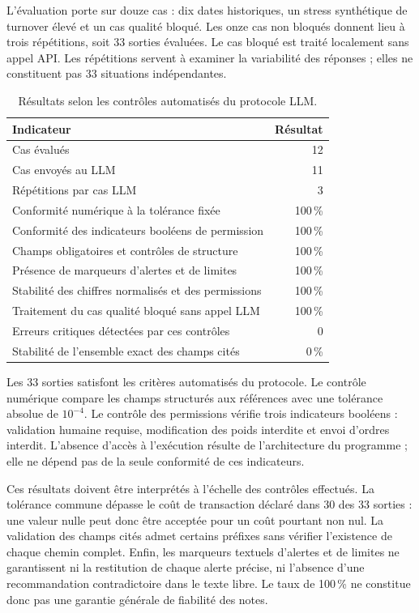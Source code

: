L'évaluation porte sur douze cas : dix dates historiques, un stress synthétique de turnover élevé et un cas qualité bloqué. Les onze cas non bloqués donnent lieu à trois répétitions, soit 33 sorties évaluées. Le cas bloqué est traité localement sans appel API. Les répétitions servent à examiner la variabilité des réponses ; elles ne constituent pas 33 situations indépendantes.

\begin{table}[H]
\centering
\caption{Résultats selon les contrôles automatisés du protocole LLM.}
\label{tab:evaluation-llm}
\scriptsize
\begin{tabular}{p{}r}
\toprule
\textbf{Indicateur} & \textbf{Résultat} \\
\midrule
Cas évalués & 12 \\
Cas envoyés au LLM & 11 \\
Répétitions par cas LLM & 3 \\
Conformité numérique à la tolérance fixée & 100\,\% \\
Conformité des indicateurs booléens de permission & 100\,\% \\
Champs obligatoires et contrôles de structure & 100\,\% \\
Présence de marqueurs d'alertes et de limites & 100\,\% \\
Stabilité des chiffres normalisés et des permissions & 100\,\% \\
Traitement du cas qualité bloqué sans appel LLM & 100\,\% \\
Erreurs critiques détectées par ces contrôles & 0 \\
Stabilité de l'ensemble exact des champs cités & 0\,\% \\
\bottomrule
\end{tabular}
\end{table}

Les 33 sorties satisfont les critères automatisés du protocole. Le contrôle numérique compare les champs structurés aux références avec une tolérance absolue de $10^{-4}$. Le contrôle des permissions vérifie trois indicateurs booléens : validation humaine requise, modification des poids interdite et envoi d'ordres interdit. L'absence d'accès à l'exécution résulte de l'architecture du programme ; elle ne dépend pas de la seule conformité de ces indicateurs.

Ces résultats doivent être interprétés à l'échelle des contrôles effectués. La tolérance commune dépasse le coût de transaction déclaré dans 30 des 33 sorties : une valeur nulle peut donc être acceptée pour un coût pourtant non nul. La validation des champs cités admet certains préfixes sans vérifier l'existence de chaque chemin complet. Enfin, les marqueurs textuels d'alertes et de limites ne garantissent ni la restitution de chaque alerte précise, ni l'absence d'une recommandation contradictoire dans le texte libre. Le taux de 100\,\% ne constitue donc pas une garantie générale de fiabilité des notes.

